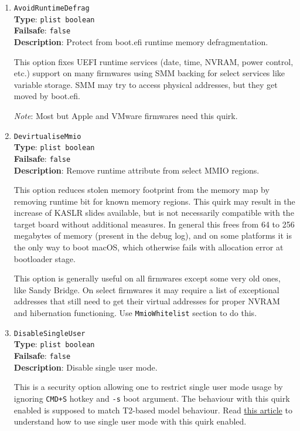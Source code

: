 \documentclass[]{article}
\begin{document}
\begin{enumerate}

\item
  \texttt{AvoidRuntimeDefrag}\\
  \textbf{Type}: \texttt{plist\ boolean}\\
  \textbf{Failsafe}: \texttt{false}\\
  \textbf{Description}: Protect from boot.efi runtime memory defragmentation.

  This option fixes UEFI runtime services (date, time, NVRAM, power control, etc.)
  support on many firmwares using SMM backing for select services like variable
  storage. SMM may try to access physical addresses, but they get moved by boot.efi.

  \emph{Note}: Most but Apple and VMware firmwares need this quirk.

\item
  \texttt{DevirtualiseMmio}\\
  \textbf{Type}: \texttt{plist\ boolean}\\
  \textbf{Failsafe}: \texttt{false}\\
  \textbf{Description}: Remove runtime attribute from select MMIO regions.

  This option reduces stolen memory footprint from the memory map by removing
  runtime bit for known memory regions. This quirk may result in the increase
  of KASLR slides available, but is not necessarily compatible with the target
  board without additional measures. In general this frees from 64 to 256
  megabytes of memory (present in the debug log), and on some platforms it
  is the only way to boot macOS, which otherwise fails with allocation
  error at bootloader stage.

  This option is generally useful on all firmwares except some very old ones,
  like Sandy Bridge. On select firmwares it may require a list of exceptional
  addresses that still need to get their virtual addresses for proper NVRAM and
  hibernation functioning. Use \texttt{MmioWhitelist} section to do this.

\item
  \texttt{DisableSingleUser}\\
  \textbf{Type}: \texttt{plist\ boolean}\\
  \textbf{Failsafe}: \texttt{false}\\
  \textbf{Description}: Disable single user mode.

  This is a security option allowing one to restrict single user mode usage
  by ignoring \texttt{CMD+S} hotkey and \texttt{-s} boot argument. The
  behaviour with this quirk enabled is supposed to match T2-based model
  behaviour. Read \href{https://support.apple.com/HT201573}{this article}
  to understand how to use single user mode with this quirk enabled.


\end{enumerate}
\end{document}
